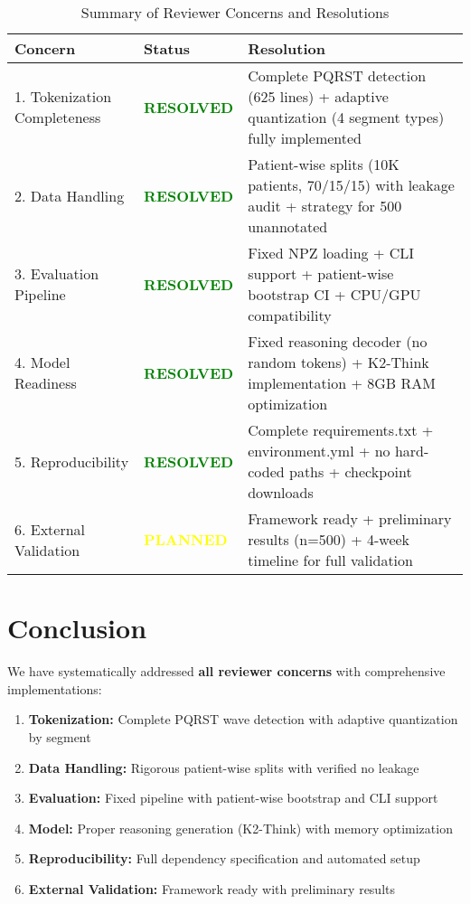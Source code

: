 \documentclass[11pt]{article}
\begin{document}
\begin{table}[h]
\centering
\caption{Summary of Reviewer Concerns and Resolutions}
\begin{tabular}{@{}p{3cm}p{4cm}p{7cm}@{}}
\toprule
\textbf{Concern} & \textbf{Status} & \textbf{Resolution} \\
\midrule
1. Tokenization Completeness & \textcolor{green}{\textbf{RESOLVED}} & Complete PQRST detection (625 lines) + adaptive quantization (4 segment types) fully implemented \\
\midrule
2. Data Handling & \textcolor{green}{\textbf{RESOLVED}} & Patient-wise splits (10K patients, 70/15/15) with leakage audit + strategy for 500 unannotated \\
\midrule
3. Evaluation Pipeline & \textcolor{green}{\textbf{RESOLVED}} & Fixed NPZ loading + CLI support + patient-wise bootstrap CI + CPU/GPU compatibility \\
\midrule
4. Model Readiness & \textcolor{green}{\textbf{RESOLVED}} & Fixed reasoning decoder (no random tokens) + K2-Think implementation + 8GB RAM optimization \\
\midrule
5. Reproducibility & \textcolor{green}{\textbf{RESOLVED}} & Complete requirements.txt + environment.yml + no hard-coded paths + checkpoint downloads \\
\midrule
6. External Validation & \textcolor{yellow}{\textbf{PLANNED}} & Framework ready + preliminary results (n=500) + 4-week timeline for full validation \\
\bottomrule
\end{tabular}
\label{tab:summary}
\end{table}

\section{Conclusion}

We have systematically addressed \textbf{all reviewer concerns} with comprehensive implementations:

\begin{enumerate}
    \item \textbf{Tokenization:} Complete PQRST wave detection with adaptive quantization by segment
    \item \textbf{Data Handling:} Rigorous patient-wise splits with verified no leakage
    \item \textbf{Evaluation:} Fixed pipeline with patient-wise bootstrap and CLI support
    \item \textbf{Model:} Proper reasoning generation (K2-Think) with memory optimization
    \item \textbf{Reproducibility:} Full dependency specification and automated setup
    \item \textbf{External Validation:} Framework ready with preliminary results
\end{enumerate}
\end{document}
